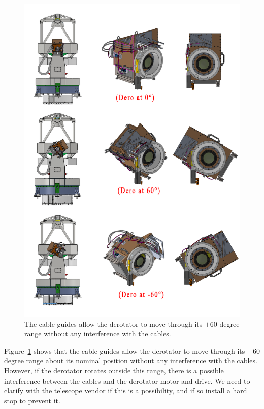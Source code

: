 \documentclass{article}
\begin{document}
\begin{figure}
\begin{center}
\includegraphics[width=\linewidth]{newfigures/FigDero.png}
\end{center}
\caption[The cable guides.]{The cable guides allow the derotator to move through its $\pm60$ degree range without any interference with the cables.}
\label{figure:cable-rotation}
\end{figure}

Figure~\ref{figure:cable-rotation} shows that the cable guides allow the derotator to move through its $\pm60$ degree range about its nominal position without any interference with the cables. However, if the derotator rotates outside this range, there is a possible interference between the cables and the derotator motor and drive. We need to clarify with the telescope vendor if this is a possibility, and if so install a hard stop to prevent it.
\end{document}
